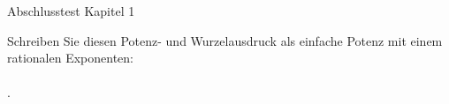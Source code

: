 \begin{MTest}{Abschlusstest Kapitel 1}
\begin{MExercise}
Schreiben Sie diesen Potenz- und Wurzelausdruck als einfache Potenz mit einem rationalen Exponenten:
\ \\ \ \\
.\\
\end{MExercise}
\end{MTest}


\newpage
\MPrintIndex


